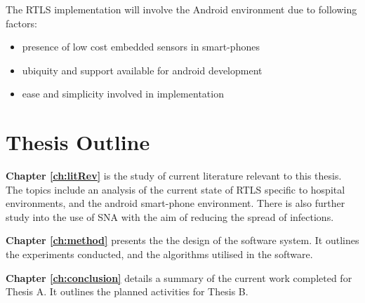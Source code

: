       	The RTLS implementation will involve the Android environment due to following factors:
		\begin{itemize}
			\item presence of low cost embedded sensors in smart-phones
            \item ubiquity and support available for android development
            \item ease and simplicity involved in implementation
		\end{itemize}
    
    \section{Thesis Outline} \label{sec:intro_outline}
    
    \textbf{Chapter \ref{ch:litRev}} is the study of current literature relevant to this thesis. The topics include an analysis of the current state of RTLS specific to hospital environments, and the android smart-phone environment. There is also further study into the use of SNA with the aim of reducing the spread of infections.
    
    \textbf{Chapter \ref{ch:method}} presents the the design of the software system. It outlines the experiments conducted, and the algorithms utilised in the software.
    
    
    \textbf{Chapter \ref{ch:conclusion}} details a summary of the current work completed for Thesis A. It outlines the planned activities for Thesis B. 